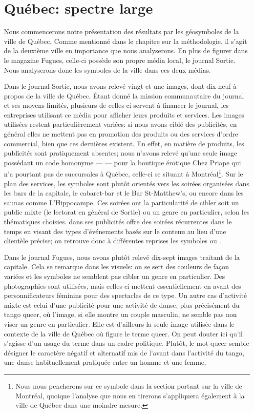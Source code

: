 \section{Québec: spectre large}
\label{sec:qu_bec_spectre_large}
Nous commencerons notre présentation des résultats par les géosymboles de la ville de Québec.
Comme mentionné dans le chapitre sur la méthodologie, il s'agit de la deuxième ville en importance que nous analyserons.
En plus de figurer dans le magazine Fugues, celle-ci possède son propre média local, le journal Sortie.
Nous analyserons donc les symboles de la ville dans ces deux médias.

Dans le journal Sortie, nous avons relevé vingt et une images, dont dix-neuf à propos de la ville de Québec.
Étant donné la mission communautaire du journal et ses moyens limités, plusieurs de celles-ci servent à financer le journal, les entreprises utilisant ce média pour afficher leurs produits et services.
Les images utilisées restent particulièrement variées: si nous avons ciblé des publicités, en général elles ne mettent pas en promotion des produits ou des services d'ordre commercial, bien que ces dernières existent.
En effet, en matière de produits, les publicités sont pratiquement absentes; nous n'avons relevé qu'une seule image possédant un code homonyme ---  --- pour la boutique érotique Chez Priape qui n'a pourtant pas de succursales à Québec, celle-ci se situant à Montréal\footnote{Nous nous pencherons sur ce symbole dans la section portant sur la ville de Montréal, quoique l'analyse que nous en tirerons s'appliquera également à la ville de Québec dans une moindre mesure.}.
Sur le plan des services, les symboles sont plutôt orientés vers les soirées organisées dans les bars de la capitale, le cabaret-bar  et le Bar St-Matthew’s, ou encore dans les saunas comme L'Hippocampe.
Ces soirées ont la particularité de cibler soit un public mixte (le lectorat en général de Sortie) ou un genre en particulier, selon les thématiques choisies.
 dans ses publicités offre des soirées récurrentes dans le temps en visant des types d'événements basés sur le contenu au lieu d'une clientèle précise; on retrouve donc à différentes reprises les symboles  ou .

Dans le journal Fugues, nous avons plutôt relevé dix-sept images traitant de la capitale.
Cela se remarque dans les visuels: on se sert des couleurs de façon variées et les symboles ne semblent pas cibler un genre en particulier.
Des photographies sont utilisées, mais celles-ci mettent essentiellement en avant des personnificateurs féminins pour des spectacles de ce type.
Un autre cas d'activité mixte est celui d'une publicité pour une activité de danse, plus précisément du tango queer, où l'image, si elle montre un couple masculin, ne semble pas non viser un genre en particulier.
Elle est d'ailleurs la seule image utilisée dans le contexte de la ville de Québec où figure le terme queer.
On peut douter ici qu'il s'agisse d'un usage du terme dans un cadre politique.
Plutôt, le mot queer semble désigner le caractère négatif et alternatif mis de l'avant dans l'activité du tango, une danse habituellement pratiquée entre un homme et une femme.

